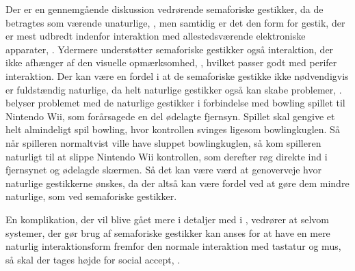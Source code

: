 Der er en gennemgående diskussion vedrørende semaforiske gestikker, da de betragtes som værende unaturlige, \parencite[s. 1961]{PDF:AStudyOnTheUseOfSemaphoricGestures}, men samtidig er det den form for gestik, der er mest udbredt indenfor interaktion med allestedsværende elektroniske apparater, \parencite[s. 28]{PDF:ATaxonomyOfGestures}. Ydermere understøtter semaforiske gestikker også interaktion, der ikke afhænger af den visuelle opmærksomhed, \parencite[s. 1964]{PDF:AStudyOnTheUseOfSemaphoricGestures}, hvilket passer godt med perifer interaktion. Der kan være en fordel i at de semaforiske gestikke ikke nødvendigvis er fuldstændig naturlige, da helt naturlige gestikker også kan skabe problemer, \parencite[s. 9]{PDF:NaturalUserInterfaces}. \textcite[s. 9]{PDF:NaturalUserInterfaces} belyser problemet med de naturlige gestikker i forbindelse med bowling spillet til Nintendo Wii, som forårsagede en del ødelagte fjernsyn. Spillet skal gengive et helt almindeligt spil bowling, hvor kontrollen svinges ligesom bowlingkuglen. Så når spilleren normaltvist ville have sluppet bowlingkuglen, så kom spilleren naturligt til at slippe Nintendo Wii kontrollen, som derefter røg direkte ind i fjernsynet og ødelagde skærmen. Så det kan være værd at genoverveje hvor naturlige gestikkerne ønskes, da der altså kan være fordel ved at gøre dem mindre naturlige, som ved semaforiske gestikker.

En komplikation, der vil blive gået mere i detaljer med i , vedrører at selvom systemer, der gør brug af semaforiske gestikker kan anses for at have en mere naturlig interaktionsform fremfor den normale interaktion med tastatur og mus, så skal der tages højde for social accept, \parencite[s. 1]{PDF:WouldYouDoThat}. 
%
